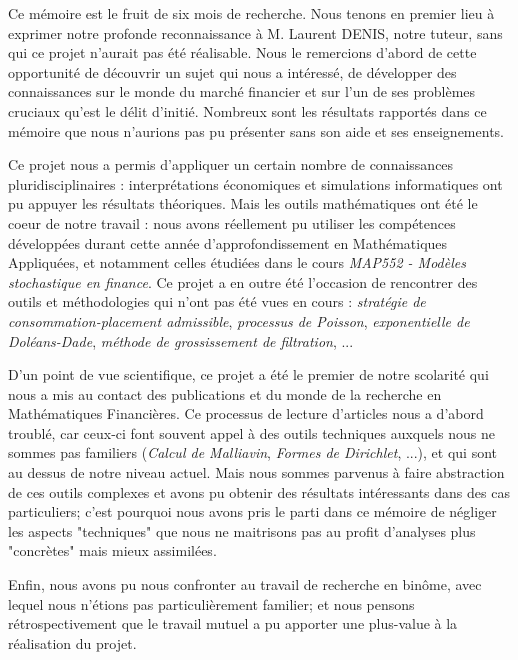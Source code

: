 \documentclass[../finalreport.tex]{subfiles}
\begin{document}
\par Ce mémoire est le fruit de six mois de recherche. Nous tenons en premier lieu à exprimer notre profonde reconnaissance à M. Laurent DENIS, notre tuteur, sans qui ce projet n'aurait pas été réalisable. Nous le remercions d'abord de cette opportunité de découvrir un sujet qui nous a intéressé, de développer des connaissances sur le monde du marché financier et sur l'un de ses problèmes cruciaux qu'est le délit d'initié. Nombreux sont les résultats rapportés dans ce mémoire que nous n'aurions pas pu présenter sans son aide et ses enseignements. \\

\par Ce projet nous a permis d'appliquer un certain nombre de connaissances pluridisciplinaires : interprétations économiques et simulations informatiques ont pu appuyer les résultats théoriques. Mais les outils mathématiques ont été le coeur de notre travail : nous avons réellement pu utiliser les compétences développées durant cette année d'approfondissement en Mathématiques Appliquées, et notamment celles étudiées dans le cours \emph{MAP552 - Modèles stochastique en finance}. Ce projet a en outre été l'occasion de rencontrer des outils et méthodologies qui n'ont pas été vues en cours : \emph{stratégie de consommation-placement admissible}, \emph{processus de Poisson}, \emph{exponentielle de Doléans-Dade}, \emph{méthode de grossissement de filtration}, ...\\

\par D'un point de vue scientifique, ce projet a été le premier de notre scolarité qui nous a mis au contact des publications et du monde de la recherche en Mathématiques Financières. Ce processus de lecture d'articles nous a d'abord troublé, car ceux-ci font souvent appel à des outils techniques auxquels nous ne sommes pas familiers (\emph{Calcul de Malliavin}, \emph{Formes de Dirichlet}, ...), et qui sont au dessus de notre niveau actuel. Mais nous sommes parvenus à faire abstraction de ces outils complexes et avons pu obtenir des résultats intéressants dans des cas particuliers; c'est pourquoi nous avons pris le parti dans ce mémoire de négliger les aspects "techniques" que nous ne maitrisons pas au profit d'analyses plus "concrètes" mais mieux assimilées.\\

\par Enfin, nous avons pu nous confronter au travail de recherche en binôme, avec lequel nous n'étions pas particulièrement familier; et nous pensons rétrospectivement que le travail mutuel a pu apporter une plus-value à la réalisation du projet. 
\end{document}
